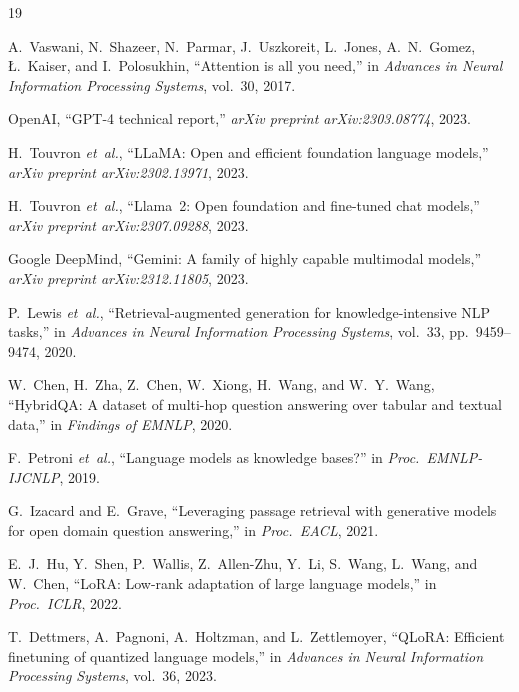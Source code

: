 \documentclass[conference,compsoc]{IEEEtran}
\begin{document}
\begin{thebibliography}{19}

A.~Vaswani, N.~Shazeer, N.~Parmar, J.~Uszkoreit, L.~Jones, A.~N.~Gomez, {\L}.~Kaiser, and I.~Polosukhin, ``Attention is all you need,'' in \emph{Advances in Neural Information Processing Systems}, vol.~30, 2017.

OpenAI, ``GPT-4 technical report,'' \emph{arXiv preprint arXiv:2303.08774}, 2023.

H.~Touvron \emph{et~al.}, ``LLaMA: Open and efficient foundation language models,'' \emph{arXiv preprint arXiv:2302.13971}, 2023.

H.~Touvron \emph{et~al.}, ``Llama~2: Open foundation and fine-tuned chat models,'' \emph{arXiv preprint arXiv:2307.09288}, 2023.

Google DeepMind, ``Gemini: A family of highly capable multimodal models,'' \emph{arXiv preprint arXiv:2312.11805}, 2023.

P.~Lewis \emph{et~al.}, ``Retrieval-augmented generation for knowledge-intensive NLP tasks,'' in \emph{Advances in Neural Information Processing Systems}, vol.~33, pp.~9459--9474, 2020.

W.~Chen, H.~Zha, Z.~Chen, W.~Xiong, H.~Wang, and W.~Y.~Wang, ``HybridQA: A dataset of multi-hop question answering over tabular and textual data,'' in \emph{Findings of EMNLP}, 2020.

F.~Petroni \emph{et~al.}, ``Language models as knowledge bases?'' in \emph{Proc.\ EMNLP-IJCNLP}, 2019.

G.~Izacard and E.~Grave, ``Leveraging passage retrieval with generative models for open domain question answering,'' in \emph{Proc.\ EACL}, 2021.

E.~J.~Hu, Y.~Shen, P.~Wallis, Z.~Allen-Zhu, Y.~Li, S.~Wang, L.~Wang, and W.~Chen, ``LoRA: Low-rank adaptation of large language models,'' in \emph{Proc.\ ICLR}, 2022.

T.~Dettmers, A.~Pagnoni, A.~Holtzman, and L.~Zettlemoyer, ``QLoRA: Efficient finetuning of quantized language models,'' in \emph{Advances in Neural Information Processing Systems}, vol.~36, 2023.


\end{thebibliography}
\end{document}
